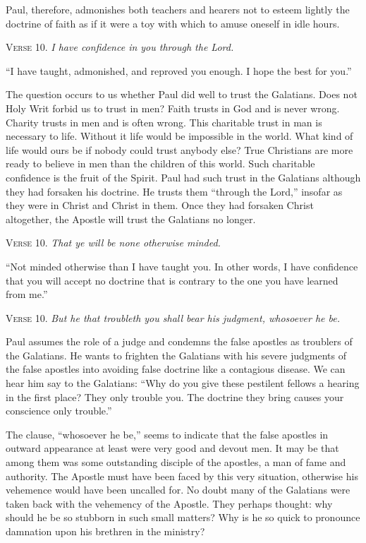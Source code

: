 Paul, therefore, admonishes both teachers and hearers not to esteem lightly the doctrine of faith as if it were a toy with which to amuse oneself in idle hours.

\textsc{Verse} 10. \emph{I have confidence in you through the Lord.}

“I have taught, admonished, and reproved you enough. I hope the best for you.”

The question occurs to us whether Paul did well to trust the Galatians. Does not Holy Writ forbid us to trust in men? Faith trusts in God and is never wrong. Charity trusts in men and is often wrong. This charitable trust in man is necessary to life. Without it life would be impossible in the world. What kind of life would ours be if nobody could trust anybody else? True Christians are more ready to believe in men than the children of this world. Such charitable confidence is the fruit of the Spirit. Paul had such trust in the Galatians although they had forsaken his doctrine. He trusts them “through the Lord,” insofar as they were in Christ and Christ in them. Once they had forsaken Christ altogether, the Apostle will trust the Galatians no longer.

\textsc{Verse} 10. \emph{That ye will be none otherwise minded.}

“Not minded otherwise than I have taught you. In other words, I have confidence that you will accept no doctrine that is contrary to the one you have learned from me.”

\textsc{Verse} 10. \emph{But he that troubleth you shall bear his judgment, whosoever he be.}

Paul assumes the role of a judge and condemns the false apostles as troublers of the Galatians. He wants to frighten the Galatians with his severe judgments of the false apostles into avoiding false doctrine like a contagious disease. We can hear him say to the Galatians: “Why do you give these pestilent fellows a hearing in the first place? They only trouble you. The doctrine they bring causes your conscience only trouble.”

The clause, “whosoever he be,” seems to indicate that the false apostles in outward appearance at least were very good and devout men. It may be that among them was some outstanding disciple of the apostles, a man of fame and authority. The Apostle must have been faced by this very situation, otherwise his vehemence would have been uncalled for. No doubt many of the Galatians were taken back with the vehemency of the Apostle. They perhaps thought: why should he be so stubborn in such small matters? Why is he so quick to pronounce damnation upon his brethren in the ministry?

